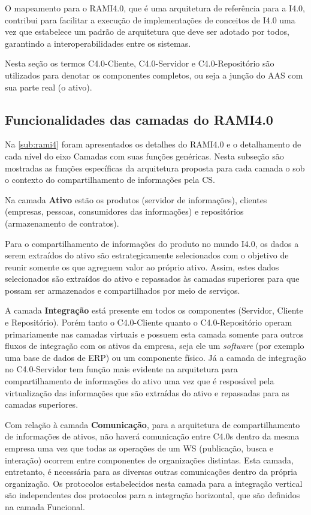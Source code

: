 O mapeamento para o RAMI4.0, que é uma arquitetura de referência para a I4.0, contribui para facilitar a execução de implementações de conceitos de I4.0 uma vez que estabelece um padrão de arquitetura que deve ser adotado por todos, garantindo a interoperabilidades entre os sistemas.

Nesta seção os termos C4.0-Cliente, C4.0-Servidor e C4.0-Repositório são utilizados para denotar os componentes completos, ou seja a junção do AAS com sua parte real (o ativo).

\subsection{Funcionalidades das camadas do RAMI4.0}

Na \autoref{sub:rami4} foram apresentados os detalhes do RAMI4.0 e o detalhamento de cada nível do eixo Camadas com suas funções genéricas. Nesta subseção são mostradas as funções específicas da arquitetura proposta para cada camada o sob o contexto do compartilhamento de informações pela CS.

Na camada \textbf{Ativo} estão os produtos (servidor de informações), clientes (empresas, pessoas, consumidores das informações) e repositórios (armazenamento de contratos).

Para o compartilhamento de informações do produto no mundo I4.0, os dados a serem extraídos do ativo são estrategicamente selecionados com o objetivo de reunir somente os que agreguem valor ao próprio ativo. Assim, estes dados selecionados são extraídos do ativo e repassados às camadas superiores para que possam ser armazenados e compartilhados por meio de serviços.

A camada \textbf{Integração} está presente em todos os componentes (Servidor, Cliente e Repositório). Porém tanto o C4.0-Cliente quanto o C4.0-Repositório operam primariamente nas camadas virtuais e possuem esta camada somente para outros fluxos de integração com os ativos da empresa, seja ele um \textit{software} (por exemplo uma base de dados de ERP) ou um componente físico. Já a camada de integração no C4.0-Servidor tem função mais evidente na arquitetura para compartilhamento de informações do ativo uma vez que é resposável pela virtualização das informações que são extraídas do ativo e repassadas para as camadas superiores.

Com relação à camada \textbf{Comunicação}, para a arquitetura de compartilhamento de informações de ativos, não haverá comunicação entre C4.0s dentro da mesma empresa uma vez que todas as operações de um WS (publicação, busca e interação) ocorrem entre componentes de organizações distintas. Esta camada, entretanto, é necessária para as diversas outras comunicações dentro da própria organização. Os protocolos estabelecidos nesta camada para a integração vertical são independentes dos protocolos para a integração horizontal, que são definidos na camada Funcional.

